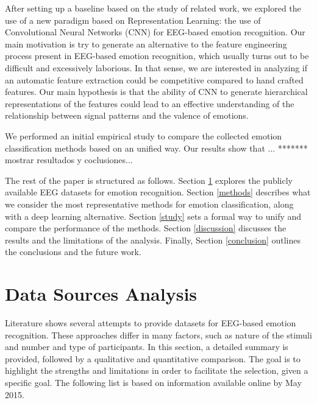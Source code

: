 \documentclass{sig-alternate}
\begin{document}
After setting up a baseline based on the study of related 
work, we explored the use of a new paradigm  based on 
Representation Learning: the use of Convolutional Neural 
Networks (CNN) for  EEG-based emotion recognition.  Our main
motivation is try to generate an alternative to the feature 
engineering process present in EEG-based emotion recognition, 
which usually turns out to be difficult and  excessively laborious. In 
that sense, we are interested in analyzing if an automatic feature 
extraction could be competitive compared to hand crafted 
features. Our main hypothesis is that  the ability of CNN to generate 
hierarchical representations of the features could lead to an 
effective understanding of the relationship between signal patterns 
and the valence of emotions.

We performed an initial empirical study to compare the collected 
emotion classification methods based on an unified way.  Our results 
show that ... ******* mostrar resultados y coclusiones...

The rest of the paper is structured as follows. Section \ref{data} 
explores the publicly  available EEG datasets for emotion 
recognition.  Section  \ref{methods} describes what we consider 
the most representative methods for emotion classification, along 
with a  deep learning alternative. Section \ref{study}
sets a formal way to unify and compare the performance of the 
methods. Section \ref{discussion} discusses the results and the 
limitations of the analysis. Finally, Section \ref{conclusion} outlines 
the conclusions and the future work. 

\section{Data Sources Analysis}
\label{data}

Literature shows several attempts  to provide datasets for EEG-based 
emotion recognition. These approaches differ in many factors, such as  nature 
of the stimuli and number and type of participants. In this section,  a detailed 
summary is provided, followed by a qualitative and quantitative
comparison.  The goal is to highlight the strengths and limitations in order to 
facilitate the selection, given  a specific goal. The following list is based on 
information available online by May 2015.
\end{document}
